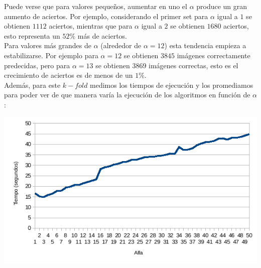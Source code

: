 Puede verse que para valores pequeños, aumentar en uno el $\alpha$ produce un gran aumento de aciertos. Por ejemplo, considerando el primer set para $\alpha$ igual a $1$ se obtienen $1112$ aciertos, mientras que para $\alpha$ igual a $2$ se obtienen $1680$ aciertos, esto representa un $52\%$ más de aciertos.
\\
Para valores más grandes de $\alpha$ (alrededor de $\alpha = 12$) esta tendencia empieza a estabilizarse. Por ejemplo para $\alpha = 12$ se obtienen $3845$ imágenes correctamente predecidas, pero para $\alpha = 13$ se obtienen $3869$ imágenes correctas, esto es el crecimiento de aciertos es de menos de un $1\%$.
\\
Además, para este $k-fold$ medimos los tiempos de ejecución y los promediamos para poder ver de que manera varía la ejecución de los algoritmos en función de $\alpha$:

\begin{center}
\includegraphics[scale=0.6]{nuevosResultados/pca/alfa/temp.png}
\end{center}


